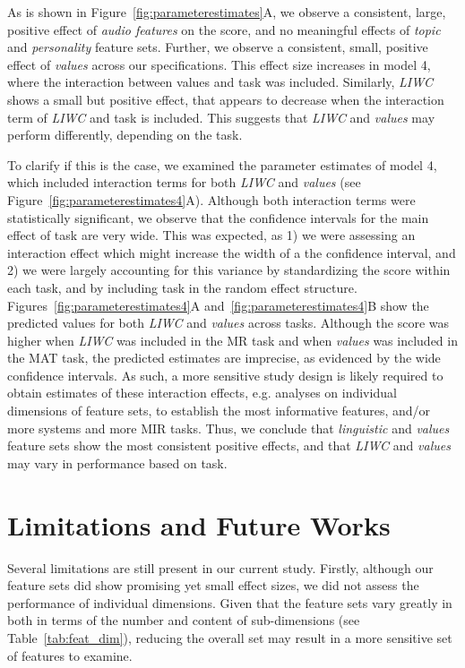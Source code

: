\documentclass{article}
\begin{document}
As is shown in Figure~\ref{fig:parameterestimates}A, we observe a consistent, large, positive effect of \emph{audio features} on the score, and no meaningful effects of \emph{topic} and \emph{personality} feature sets. Further, we observe a consistent, small, positive effect of \emph{values} across our specifications. This effect size increases in model 4, where the interaction between values and task was included. Similarly, \emph{LIWC} shows a small but positive effect, that appears to decrease when the interaction term of \emph{LIWC} and task is included. This suggests that \emph{LIWC} and \emph{values} may perform differently, depending on the task.

To clarify if this is the case, we examined the parameter estimates of model 4, which included interaction terms for both \emph{LIWC} and \emph{values} (see Figure~\ref{fig:parameterestimates4}A). Although both interaction terms were statistically significant, we observe that the confidence intervals for the main effect of task are very wide. This was expected, as 1) we were assessing an interaction effect which might increase the width of a the confidence interval, and 2) we were largely accounting for this variance by standardizing the score within each task, and by including task in the random effect structure. Figures~\ref{fig:parameterestimates4}A and~\ref{fig:parameterestimates4}B show the predicted values for both \emph{LIWC} and \emph{values} across tasks. Although the score was higher when \emph{LIWC} was included in the MR task and when \emph{values} was included in the MAT task, the predicted estimates are imprecise, as evidenced by the wide confidence intervals. As such, a more sensitive study design is likely required to obtain estimates of these interaction effects, e.g. analyses on individual dimensions of feature sets, to establish the most informative features, and/or more systems and more MIR tasks. Thus, we conclude that \emph{linguistic} and \emph{values} feature sets show the most consistent positive effects, and that \emph{LIWC} and \emph{values} may vary in performance based on task. 


\section{Limitations and Future Works}\label{sec:lim_fut}

Several limitations are still present in our current study. Firstly, although our feature sets did show promising yet small effect sizes, we did not assess the performance of individual dimensions. %
Given that the feature sets vary greatly in both in terms of the number and content of sub-dimensions (see Table~\ref{tab:feat_dim}), reducing the overall set may result in a more sensitive set of features to examine.
\end{document}
